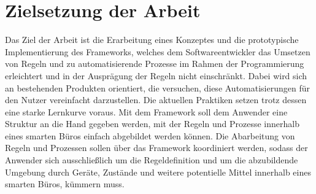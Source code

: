 \section{Zielsetzung der Arbeit}
\label{sec:zielsetzung}
    Das Ziel der Arbeit ist die Erarbeitung eines Konzeptes und die prototypische Implementierung des Frameworks, welches dem Softwareentwickler das 
    Umsetzen von Regeln und zu automatisierende Prozesse im Rahmen der Programmierung erleichtert und in der Ausprägung 
    der Regeln nicht einschränkt. Dabei wird sich an bestehenden Produkten orientiert, die versuchen, diese 
    Automatisierungen für den Nutzer vereinfacht darzustellen. Die aktuellen Praktiken setzen trotz dessen eine starke Lernkurve voraus. 
    Mit dem Framework soll dem Anwender eine Struktur an die Hand gegeben werden, mit der Regeln und Prozesse innerhalb eines 
    smarten Büros einfach abgebildet werden können. Die Abarbeitung von Regeln und Prozessen sollen über das Framework 
    koordiniert werden, sodass der Anwender sich ausschließlich um die Regeldefinition und um die abzubildende Umgebung durch Geräte, Zustände und weitere 
    potentielle Mittel innerhalb eines smarten Büros, kümmern muss. 





